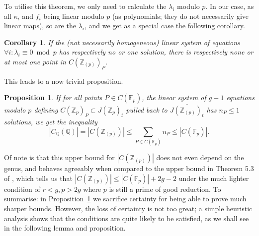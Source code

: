 \documentclass[12pt]{article}
\newcommand{\Z}{\mathbb{Z}}
\newcommand{\Q}{\mathbb{Q}}
\newcommand{\F}{\mathbb{F}}
\theoremstyle{plain}
\newtheorem{cor}[thm]{Corollary} %
\newtheorem{prop}[thm]{Proposition} %
\theoremstyle{definition}
\theoremstyle{remark}
\begin{document}
To utilise this theorem, we only need to calculate the $\lambda_i$ modulo $p$. In our case, as all $\kappa_i$ and $f_i$ being linear modulo $p$ (as polynomials; they do not necessarily give linear maps), so are the $\lambda_i$, and we get as a special case the following corollary.
\begin{cor}
\label{cor:finedixlinear}
If the (not necessarily homogeneous) linear system of equations $\forall i: \lambda_i \equiv 0 \bmod p$ has respectively no or one solution, there is respectively none or at most one point in $C(\Z_{(p)})_P$.
\end{cor}

This leads to a now trivial proposition.
\begin{prop}
\label{prop:linchabauty}
If for all points $P \in C(\F_p)$, the linear system of $g-1$ equations modulo $p$ defining $C(\Z_p)_P \subset J(\Z_p)_t$ pulled back to $\overline{J(\Z_{(p)})_t}$ has $n_P \leq 1$ solutions, we get the inequality
\[
|C_{\Q}(\Q)| = |C(\Z_{(p)})| \leq \sum_{P \in C(\F_p)} n_P \leq |C(\F_p)|. 
\]
\end{prop}

Of note is that this upper bound for $|C(\Z_{(p)})|$ does not even depend on the genus, and behaves agreeably when compared to the upper bound in Theorem 5.3 of \cite{poonen12}, which tells us that $|C(\Z_{(p)})| \leq |C(\F_p)| + 2g-2$ under the much lighter condition of $r < g, p > 2g$ where $p$ is still a prime of good reduction. To summarise: in Proposition~\ref{prop:linchabauty} we sacrifice certainty for being able to prove much sharper bounds. However, the loss of certainty is not too great; a simple heuristic analysis shows that the conditions are quite likely to be satisfied, as we shall see in the following lemma and proposition.
\end{document}
